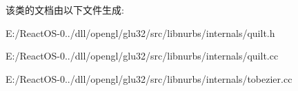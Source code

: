 该类的文档由以下文件生成\+:\begin{DoxyCompactItemize}
\item 
E\+:/\+React\+O\+S-\/0../dll/opengl/glu32/src/libnurbs/internals/quilt.\+h\item 
E\+:/\+React\+O\+S-\/0../dll/opengl/glu32/src/libnurbs/internals/quilt.\+cc\item 
E\+:/\+React\+O\+S-\/0../dll/opengl/glu32/src/libnurbs/internals/tobezier.\+cc\end{DoxyCompactItemize}
